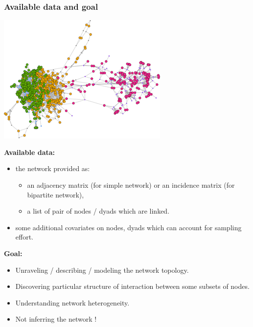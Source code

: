 \documentclass[nopagenumber,9pt]{beamer}
\begin{document}
\begin{frame}
 \frametitle{Available data and goal}
 
 
\begin{center}
 \includegraphics[scale=.4]{plots/image_SBM.png}
\end{center}

\bigskip
\textbf{Available data:}
\begin{itemize}
 \item  the network provided as:
\begin{itemize}
 \item an adjacency matrix (for simple network) or an incidence matrix (for bipartite network),
 \item a list of pair of nodes / dyads which are linked.
\end{itemize}

\item some additional covariates on nodes, dyads which can account for sampling effort.
 \end{itemize}



\bigskip


\textbf{Goal:}
\begin{itemize}
 \item Unraveling / describing / modeling the network topology. 
 \item Discovering particular structure of interaction between some subsets of nodes.
 \item Understanding network heterogeneity.
 \item Not inferring the network !
 \end{itemize}


\end{frame}
\end{document}
